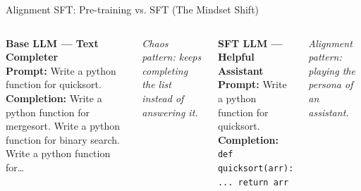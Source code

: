 \documentclass[aspectratio=169]{beamer}
\begin{document}
\begin{frame}{Alignment SFT: Pre-training vs. SFT (The Mindset Shift)}
  \small
  \begin{columns}[t]
      \begin{warmbox}
        \textbf{\color{AtlasWarm}Base LLM --- Text Completer}\\[3pt]
        \textbf{Prompt:} Write a python function for quicksort.\\[3pt]
        \textbf{Completion:} Write a python function for mergesort.\newline
        Write a python function for binary search.\newline
        Write a python function for\ldots
      \end{warmbox}
      \vspace{3pt}
      {\itshape Chaos pattern: keeps completing the list instead of answering it.}
      \begin{warmbox}
        \textbf{\color{AtlasWarm}SFT LLM --- Helpful Assistant}\\[3pt]
        \textbf{Prompt:} Write a python function for quicksort.\\[3pt]
        \textbf{Completion:}\\
        \texttt{\scriptsize def quicksort(arr): ... return arr \\[2pt] \\}
      \end{warmbox}
      \vspace{3pt}
      {\itshape Alignment pattern: playing the persona of an assistant.}
  \end{columns}
\end{frame}
\end{document}
